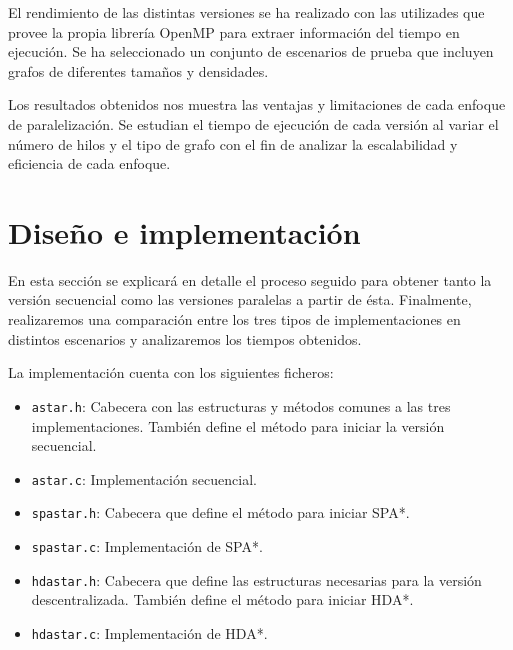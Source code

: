 \documentclass[a4paper,12pt]{article}
\begin{document}
El rendimiento de las distintas versiones se ha realizado con las utilizades que provee la propia librería OpenMP para extraer información del tiempo en ejecución. Se ha seleccionado un conjunto de escenarios de prueba que incluyen grafos de diferentes tamaños y densidades. 

Los resultados obtenidos nos muestra las ventajas y limitaciones de cada enfoque de paralelización. Se estudian el tiempo de ejecución de cada versión al variar el número de hilos y el tipo de grafo con el fin de analizar la escalabilidad y eficiencia de cada enfoque.

\newpage

\section{Diseño e implementación} \label{sec:implementacion}

En esta sección se explicará en detalle el proceso seguido para obtener tanto la versión secuencial como las versiones paralelas a partir de ésta. Finalmente, realizaremos una comparación entre los tres tipos de implementaciones en distintos escenarios y analizaremos los tiempos obtenidos.

La implementación cuenta con los siguientes ficheros:

\begin{itemize}
    \item \verb|astar.h|: Cabecera con las estructuras y métodos comunes a las tres implementaciones. También define el método para iniciar la versión secuencial.
    \item \verb|astar.c|: Implementación secuencial.
    \item \verb|spastar.h|: Cabecera que define el método para iniciar SPA*.
    \item \verb|spastar.c|: Implementación de SPA*.
    \item \verb|hdastar.h|: Cabecera que define las estructuras necesarias para la versión descentralizada. También define el método para iniciar HDA*.
    \item \verb|hdastar.c|: Implementación de HDA*.
\end{itemize}
\end{document}
